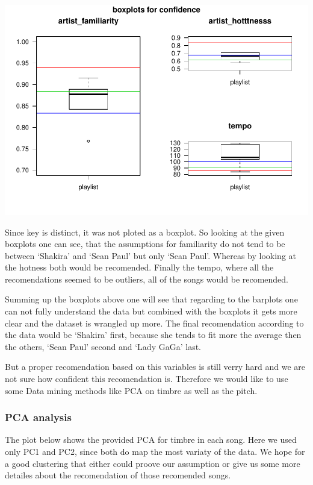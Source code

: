 \documentclass[]{article}
\begin{document}
\includegraphics{Project2_files/figure-latex/Boxplot-1.pdf}

Since key is distinct, it was not ploted as a boxplot. So looking at the
given boxplots one can see, that the assumptions for familiarity do not
tend to be between `Shakira' and `Sean Paul' but only `Sean Paul'.
Whereas by looking at the hotness both would be recomended. Finally the
tempo, where all the recomendations seemed to be outliers, all of the
songs would be recomended.

Summing up the boxplots above one will see that regarding to the
barplots one can not fully understand the data but combined with the
boxplots it gets more clear and the dataset is wrangled up more. The
final recomendation according to the data would be `Shakira' first,
because she tends to fit more the average then the others, `Sean Paul'
second and `Lady GaGa' last.

But a proper recomendation based on this variables is still verry hard
and we are not sure how confident this recomendation is. Therefore we
would like to use some Data mining methods like PCA on timbre as well as
the pitch.

\subsubsection{PCA analysis}\label{pca-analysis}

The plot below shows the provided PCA for timbre in each song. Here we
used only PC1 and PC2, since both do map the most variaty of the data.
We hope for a good clustering that either could proove our assumption or
give us some more detailes about the recomendation of those recomended
songs.
\end{document}
